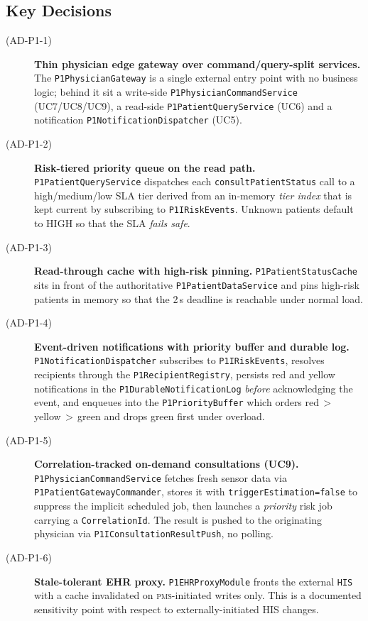 \subsection*{Key Decisions}
\begin{description}
  \item[(AD-P1-1)] \textbf{Thin physician edge gateway over
        command/query-split services.}
        The \texttt{P1PhysicianGateway} is a single external entry point
        with no business logic; behind it sit a write-side
        \texttt{P1PhysicianCommandService} (UC7/UC8/UC9), a read-side
        \texttt{P1PatientQueryService} (UC6) and a notification
        \texttt{P1NotificationDispatcher} (UC5).
  \item[(AD-P1-2)] \textbf{Risk-tiered priority queue on the read path.}
        \texttt{P1PatientQueryService} dispatches each
        \texttt{consultPatientStatus} call to a high/medium/low SLA tier
        derived from an in-memory \emph{tier index} that is kept current
        by subscribing to \texttt{P1IRiskEvents}. Unknown patients default
        to HIGH so that the SLA \emph{fails safe}.
  \item[(AD-P1-3)] \textbf{Read-through cache with high-risk pinning.}
        \texttt{P1PatientStatusCache} sits in front of the authoritative
        \texttt{P1PatientDataService} and pins high-risk patients in
        memory so that the 2\,s deadline is reachable under normal load.
  \item[(AD-P1-4)] \textbf{Event-driven notifications with priority buffer
        and durable log.}
        \texttt{P1NotificationDispatcher} subscribes to
        \texttt{P1IRiskEvents}, resolves recipients through the
        \texttt{P1RecipientRegistry}, persists red and yellow
        notifications in the \texttt{P1DurableNotificationLog}
        \emph{before} acknowledging the event, and enqueues into the
        \texttt{P1PriorityBuffer} which orders red\,$>$\,yellow\,$>$\,green
        and drops green first under overload.
  \item[(AD-P1-5)] \textbf{Correlation-tracked on-demand consultations
        (UC9).}
        \texttt{P1PhysicianCommandService} fetches fresh sensor data via
        \texttt{P1PatientGatewayCommander}, stores it with
        \texttt{triggerEstimation=false} to suppress the implicit
        scheduled job, then launches a \emph{priority} risk job carrying
        a \texttt{CorrelationId}. The result is pushed to the originating
        physician via \texttt{P1IConsultationResultPush}, no polling.
  \item[(AD-P1-6)] \textbf{Stale-tolerant EHR proxy.}
        \texttt{P1EHRProxyModule} fronts the external \texttt{HIS} with a
        cache invalidated on \textsc{pms}-initiated writes only. This is a
        documented sensitivity point with respect to externally-initiated
        HIS changes.
\end{description}

